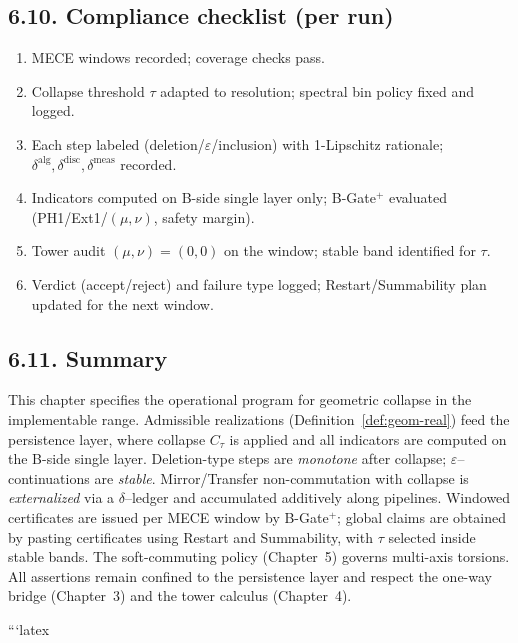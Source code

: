\documentclass[11pt]{article}
\DeclareRobustCommand{\hyp}{\nobreakdash-}
\numberwithin{equation}{section}
\theoremstyle{definition}
\begin{document}
\subsection*{6.10. Compliance checklist (per run)}\label{subsec:compliance}
\begin{enumerate}
  \item MECE windows recorded; coverage checks pass.
  \item Collapse threshold \(\tau\) adapted to resolution; spectral bin policy fixed and logged.
  \item Each step labeled (deletion/\(\varepsilon\)/inclusion) with 1\hyp Lipschitz rationale; \(\delta^{\mathrm{alg}},\delta^{\mathrm{disc}},\delta^{\mathrm{meas}}\) recorded.
  \item Indicators computed on B\hyp side single layer only; B\hyp Gate$^{+}$ evaluated (PH1/Ext1/$(\mu,\nu)$, safety margin).
  \item Tower audit $(\mu,\nu)=(0,0)$ on the window; stable band identified for \(\tau\).
  \item Verdict (accept/reject) and failure type logged; Restart/Summability plan updated for the next window.
\end{enumerate}

\subsection*{6.11. Summary}
This chapter specifies the operational program for geometric collapse in the implementable range. Admissible realizations (Definition~\ref{def:geom-real}) feed the persistence layer, where collapse $C_\tau$ is applied and all indicators are computed on the B\hyp side single layer. Deletion\hyp type steps are \emph{monotone} after collapse; $\varepsilon$–continuations are \emph{stable}. Mirror/Transfer non\hyp commutation with collapse is \emph{externalized} via a \(\delta\)–ledger and accumulated additively along pipelines. Windowed certificates are issued per MECE window by B\hyp Gate$^{+}$; global claims are obtained by pasting certificates using Restart and Summability, with $\tau$ selected inside stable bands. The soft\hyp commuting policy (Chapter~5) governs multi\hyp axis torsions. All assertions remain confined to the persistence layer and respect the one\hyp way bridge (Chapter~3) and the tower calculus (Chapter~4).



```latex
\end{document}
